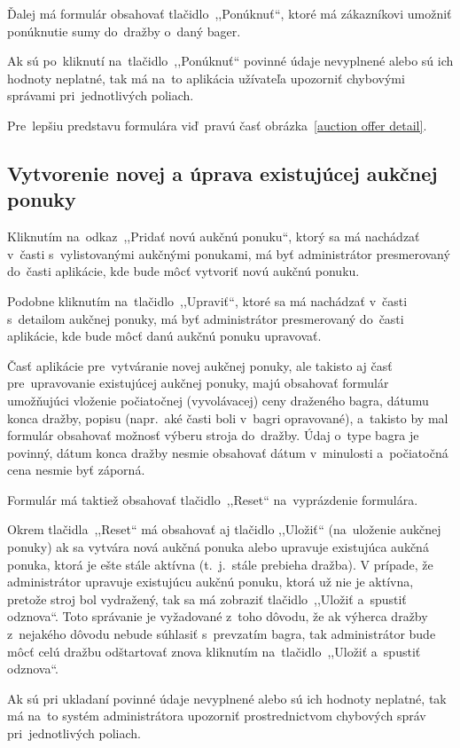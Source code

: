 Ďalej má formulár obsahovať tlačidlo~,,Ponúknuť``, ktoré má zákazníkovi umožniť ponúknutie sumy do~dražby o~daný bager.

Ak sú po~kliknutí na~tlačidlo~,,Ponúknuť`` povinné údaje nevyplnené alebo sú ich hodnoty neplatné, tak má na~to aplikácia užívateľa upozorniť chybovými správami pri~jednotlivých poliach.

Pre~lepšiu predstavu formulára viď~pravú časť obrázka~\ref{auction offer detail}.

\subsection{Vytvorenie novej a úprava existujúcej aukčnej ponuky}

Kliknutím na~odkaz~,,Pridať novú aukčnú ponuku``, ktorý sa má nachádzať v~časti s~vylistovanými aukčnými ponukami, má byť administrátor presmerovaný do~časti aplikácie, kde bude môcť vytvoriť novú aukčnú ponuku.

Podobne kliknutím na~tlačidlo~,,Upraviť``, ktoré sa má nachádzať v~časti s~detailom aukčnej ponuky, má byť administrátor presmerovaný do~časti aplikácie, kde bude môcť danú aukčnú ponuku upravovať.

Časť aplikácie pre~vytváranie novej aukčnej ponuky, ale takisto aj časť pre~u\-pra\-vo\-va\-nie existujúcej aukčnej ponuky, majú obsahovať formulár umožňujúci vloženie počiatočnej (vyvolávacej) ceny draženého bagra, dátumu konca dražby, popisu (napr.~aké časti boli v~bagri opravované), a~takisto by mal formulár obsahovať možnosť výberu stroja do~dražby. Údaj o~type bagra je povinný, dátum konca dražby nesmie obsahovať dátum v~minulosti a~počiatočná cena nesmie byť záporná.

Formulár má taktiež obsahovať tlačidlo~,,Reset`` na~vyprázdenie formulára.

Okrem tlačidla~,,Reset`` má obsahovať aj tlačidlo ,,Uložiť`` (na~uloženie aukčnej ponuky) ak sa vytvára nová aukčná ponuka alebo upravuje existujúca aukčná ponuka, ktorá je ešte stále aktívna (t.~j.~stále prebieha dražba). V prípade, že administrátor upravuje existujúcu aukčnú ponuku, ktorá už nie je aktívna, pretože stroj bol vydražený, tak sa má zobraziť tlačidlo~,,Uložiť a~spustiť odznova``. Toto správanie je vyžadované z~toho dôvodu, že ak výherca dražby z~nejakého dôvodu nebude súhlasiť s~prevzatím bagra, tak administrátor bude môcť celú dražbu odštartovať znova kliknutím na~tlačidlo~,,Uložiť a~spustiť odznova``.

Ak sú pri ukladaní povinné údaje nevyplnené alebo sú ich hodnoty neplatné, tak má na~to systém administrátora upozorniť prostrednictvom chybových správ pri~jednotlivých poliach.

